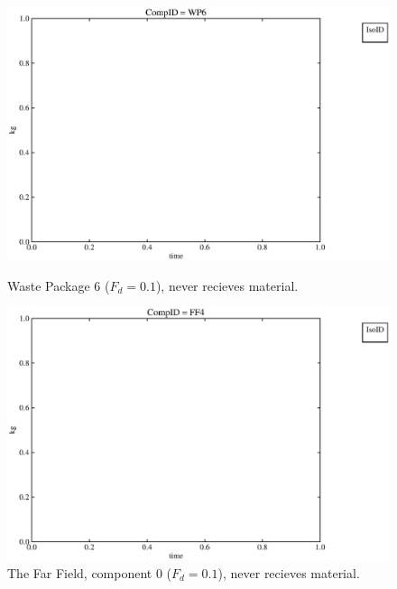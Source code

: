 \begin{figure}[ht]
\begin{minipage}[b]{0.45\linewidth}
\end{minipage}
\hspace{0.05\linewidth}
\begin{minipage}[b]{0.45\linewidth}
  \includegraphics[width=\textwidth]{./chapters/demonstration/base/drI2.eps}
  \caption[Case DRI Waste Package Contaminants.]{ 
    Waste Package 6 ($F_d = 0.1$), never recieves material.
    }
  \label{fig:drIwp6}

  \includegraphics[width=\textwidth]{./chapters/demonstration/base/drI0.eps}
  \caption[Case DRI Far Field Contaminants.]{ 
    The Far Field, component 0 ($F_d = 0.1$), never recieves material.
    }
  \label{fig:drIff0}

  \end{minipage}
\end{figure}
\FloatBarrier



